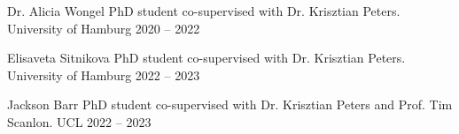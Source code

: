 



\begin{cvhonors}

  \cvhonor
    {Dr. Alicia Wongel} %
    {PhD student co-supervised with Dr. Krisztian Peters.} %
    {University of Hamburg} %
    {2020 -- 2022} %

  \cvhonor
    {Elisaveta Sitnikova} %
    {PhD student co-supervised with Dr. Krisztian Peters.} %
    {University of Hamburg} %
    {2022 -- 2023} %

  \cvhonor
    {Jackson Barr} %
    {PhD student co-supervised with Dr. Krisztian Peters and Prof. Tim Scanlon.} %
    {UCL} %
    {2022 -- 2023} %

\end{cvhonors}



